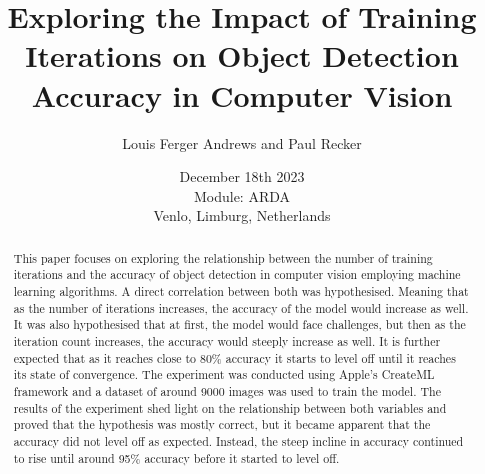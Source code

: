 \documentclass[]{report}
\title{Exploring the Impact of Training Iterations on Object Detection Accuracy in Computer Vision}
\author{Louis Ferger Andrews and Paul Recker}
\date{December 18th 2023 \\Module: ARDA \\Venlo, Limburg, Netherlands}
\begin{document}
\maketitle

\begin{abstract}
This paper focuses on exploring the relationship between the number of training iterations and the accuracy of object detection
in computer vision employing machine learning algorithms. A direct correlation between both was hypothesised. Meaning that as the number
of iterations increases, the accuracy of the model would increase as well. It was also hypothesised that at first, the model would face
challenges, but then as the iteration count increases, the accuracy would steeply increase as well. It is further expected that
as it reaches close to 80\% accuracy it starts to level off until it reaches its state of convergence. 
The experiment was conducted using Apple's CreateML framework and a dataset of around 9000 images was used to train the model.
The results of the experiment shed light on the relationship between both variables and proved that the hypothesis was mostly correct, 
but it became apparent that the accuracy did not level off as expected. Instead, the steep incline in accuracy continued to rise until
around 95\% accuracy before it started to level off. 

\end{abstract}

\tableofcontents
\setcounter{page}{3}
\listoffigures %
\listoftables %
\pagebreak
{}	
	
 




\printbibliography[title=References]

\clearpage
\appendix

\end{document}
